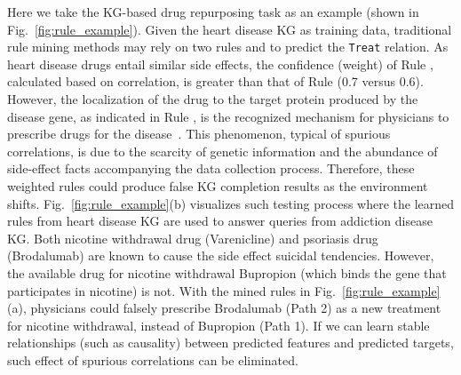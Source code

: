 Here we take the KG-based drug repurposing task as an example (shown in Fig.~\ref{fig:rule_example}).
Given the heart disease KG as training data, traditional rule mining methods may rely on two rules  and  to predict the \texttt{Treat} relation.
As heart disease drugs entail similar side effects, the confidence (weight) of Rule , calculated based on correlation, is greater than that of Rule  (0.7 versus 0.6).
However, the localization of the drug to the target protein produced by the disease gene, as indicated in Rule , is the recognized mechanism for physicians to prescribe drugs for the disease~\cite{himmelstein2017systematic}.
This phenomenon, typical of spurious correlations, is due to the scarcity of genetic information and the abundance of side-effect facts accompanying the data collection process.
Therefore, these weighted rules could produce false KG completion results as the environment shifts.
Fig.~\ref{fig:rule_example}(b) visualizes such testing process where the learned rules from heart disease KG are used to answer queries from addiction disease KG.
Both nicotine withdrawal drug (Varenicline) and psoriasis drug (Brodalumab) are known to cause the side effect suicidal tendencies.
However, the available drug for nicotine withdrawal Bupropion (which binds the gene that participates in nicotine) is not.
With the mined rules in Fig.~\ref{fig:rule_example}(a), physicians could falsely prescribe Brodalumab (Path 2) as a new treatment for nicotine withdrawal, instead of Bupropion (Path 1).
If we can learn stable relationships (such as causality) between predicted features and predicted targets, such effect of spurious correlations can be eliminated.


